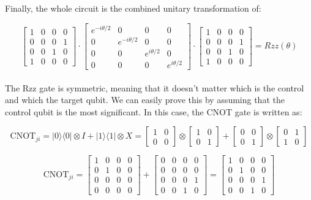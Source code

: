 \documentclass[12pt,a4paper]{report}
\begin{document}
\noindent
Finally, the whole circuit is the combined unitary transformation of:

\[
\begin{bmatrix} 1 & 0 & 0 & 0 \\ 0 & 0 & 0 & 1 \\ 0 & 0 & 1 & 0 \\ 1 & 0 & 0 & 0 \end{bmatrix} \cdot \begin{bmatrix} e^{-i\theta/2} & 0 & 0 & 0 \\ 0 & e^{-i\theta/2} & 0 & 0 \\ 0 & 0 & e^{i\theta/2} & 0 \\ 0 & 0 & 0 & e^{i\theta/2} \end{bmatrix} \cdot \begin{bmatrix} 1 & 0 & 0 & 0 \\ 0 & 0 & 0 & 1 \\ 0 & 0 & 1 & 0 \\ 1 & 0 & 0 & 0 \end{bmatrix} = Rzz(\theta)
\]
\\

\noindent
The Rzz gate is symmetric, meaning that it doesn't matter which is the control and which the target qubit. We can easily prove this by assuming that the control qubit is the most significant. In this case, the CNOT gate is written as:

\[
\text{CNOT}_{ji} = |0\rangle\langle0| \otimes I + |1\rangle\langle1| \otimes X = \begin{bmatrix} 1 & 0 \\ 0 & 0 \end{bmatrix} \otimes \begin{bmatrix} 1 & 0 \\ 0 & 1 \end{bmatrix} + \begin{bmatrix} 0 & 0 \\ 0 & 1 \end{bmatrix} \otimes \begin{bmatrix} 0 & 1 \\ 1 & 0 \end{bmatrix} 
\]

\[
\text{CNOT}_{ji} = \begin{bmatrix} 1 & 0 & 0 & 0 \\ 0 & 1 & 0 & 0 \\ 0 & 0 & 0 & 0 \\ 0 & 0 & 0 & 0 \end{bmatrix} + \begin{bmatrix} 0 & 0 & 0 & 0 \\ 0 & 0 & 0 & 0 \\ 0 & 0 & 0 & 1 \\ 0 & 0 & 1 & 0 \end{bmatrix} 
= \begin{bmatrix} 1 & 0 & 0 & 0 \\ 0 & 1 & 0 & 0 \\ 0 & 0 & 0 & 1 \\ 0 & 0 & 1 & 0 \end{bmatrix}
\]
\\
\end{document}
